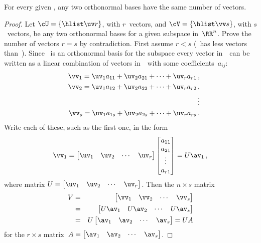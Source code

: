 \begin{theorem} \label{thm:sameD} 
For every given , any two orthonormal bases have the same number of vectors.
\end{theorem}
\begin{proof} 
Let \(\cU=\{\hlist\uv r\}\), with \(r\)~vectors, and \(\cV=\{\hlist\vv s\}\), with \(s\)~vectors, be any two orthonormal bases for a given subspace in~\(\RR^n\).
Prove the number of vectors \(r=s\) by contradiction.
First assume \(r<s\) (\cU\ has less vectors than~\cV).
Since \cU\ is an orthonormal basis for the subspace every vector in~\cV\ can be written as a linear combination of vectors in~\cU\ with some coefficients~\(a_{ij}\):
\begin{eqnarray*}
  &&\vv_1=\uv_1a_{11}+\uv_2a_{21}+\cdots+\uv_ra_{r1}\,,
\\&&\vv_2=\uv_1a_{12}+\uv_2a_{22}+\cdots+\uv_ra_{r2}\,,
\\&&\qquad\vdots
\\&&\vv_s=\uv_1a_{1s}+\uv_2a_{2s}+\cdots+\uv_ra_{rs}\,.
\end{eqnarray*}
Write each of these, such as the first one, in the form
\begin{equation*}
\vv_1=\begin{bmatrix} \uv_1&\uv_2&\cdots&\uv_r \end{bmatrix}
\begin{bmatrix} a_{11}\\a_{21}\\\vdots\\a_{r1} \end{bmatrix}
=U\av_1\,,
\end{equation*}
where matrix \(U=\begin{bmatrix} \uv_1&\uv_2&\cdots&\uv_r \end{bmatrix}\).
Then the \(n\times s\) matrix
\begin{eqnarray*}
V&=&\begin{bmatrix} \vv_1&\vv_2&\cdots&\vv_s \end{bmatrix}
\\&=&\begin{bmatrix} U\av_1& U\av_2&\cdots&U\av_s\end{bmatrix}
\\&=&U\begin{bmatrix} \av_1& \av_2&\cdots&\av_s\end{bmatrix}
=UA
\end{eqnarray*}
for the \(r\times s\) matrix~\(A=\begin{bmatrix} \av_1& \av_2&\cdots&\av_s \end{bmatrix}\).

\end{proof}
